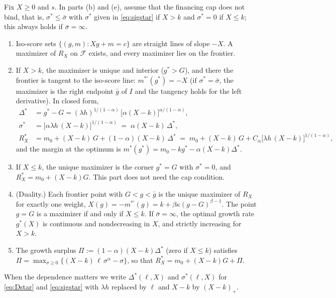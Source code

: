 \begin{lemma}\label{prop:score}\label{prop:optimum}
Fix $X\ge 0$ and $s$. In parts (b) and (e), assume that the financing cap does not bind, that is, $\sigma^*\le\bar\sigma$ with $\sigma^*$ given in \eqref{eq:sigstar} if $X>k$ and $\sigma^*=0$ if $X\le k$; this always holds if $\bar\sigma=\infty$.
\begin{enumerate}
\item[(a)] Iso-score sets $\{(g,m):Xg+m=c\}$ are straight lines of slope $-X$. A maximizer of $R_X$ on $\mathcal F$ exists, and every maximizer lies on the frontier.
\item[(b)] If $X>k$, the maximizer is unique and interior ($g^*>G$), and there the frontier is tangent to the iso-score line: $m^{*\prime}(g^*)=-X$ (if $\sigma^*=\bar\sigma$, the maximizer is the right endpoint $\bar g$ of $I$ and the tangency holds for the left derivative). In closed form,
\begin{align}
\Delta^* &= g^*-G=(\lambda h)^{1/(1-\alpha)}\,\bigl[\alpha(X-k)\bigr]^{\alpha/(1-\alpha)}, \label{eq:Dstar}\\
\sigma^* &= \bigl[\alpha\lambda h\,(X-k)\bigr]^{1/(1-\alpha)} \;=\; \alpha(X-k)\,\Delta^*, \label{eq:sigstar}\\
R_X^* &= m_0+(X-k)\,G+(1-\alpha)(X-k)\,\Delta^* \;=\; m_0+(X-k)\,G+C_\alpha\bigl[\lambda h\,(X-k)\bigr]^{1/(1-\alpha)}, \label{eq:Rstar}
\end{align}
and the margin at the optimum is $m^*(g^*)=m_0-kg^*-\alpha(X-k)\Delta^*$.
\item[(c)] If $X\le k$, the unique maximizer is the corner $g^*=G$ with $\sigma^*=0$, and $R_X^*=m_0+(X-k)G$. This part does not need the cap condition.
\item[(d)] (Duality.) Each frontier point with $G<g<\bar g$ is the unique maximizer of $R_X$ for exactly one weight, $X(g)=-m^{*\prime}(g)=k+\beta\kappa(g-G)^{\beta-1}$. The point $g=G$ is a maximizer if and only if $X\le k$. If $\bar\sigma=\infty$, the optimal growth rate $g^*(X)$ is continuous and nondecreasing in $X$, and strictly increasing for $X>k$.
\item[(e)] The growth surplus $\Pi:=(1-\alpha)(X-k)\Delta^*$ (zero if $X\le k$) satisfies $\Pi=\max_{\sigma\ge 0}\{(X-k)\,\ell\,\sigma^{\alpha}-\sigma\}$, so that $R_X^*=m_0+(X-k)G+\Pi$.
\end{enumerate}
\end{lemma}

When the dependence matters we write $\Delta^*(\ell,X)$ and $\sigma^*(\ell,X)$ for \eqref{eq:Dstar} and \eqref{eq:sigstar} with $\lambda h$ replaced by $\ell$ and $X-k$ by $(X-k)_+$.

